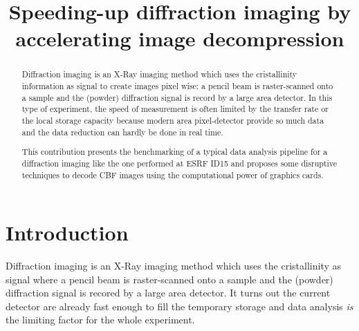 \documentclass[preprint, pdf]{iucr}              %
\begin{document}

\title{Speeding-up diffraction imaging by accelerating image decompression}

 





\maketitle                        %

\begin{synopsis}
\end{synopsis}

\begin{abstract}

Diffraction imaging is an X-Ray imaging method which uses the cristallinity
information as signal to create images pixel wise: 
a pencil beam is raster-scanned onto a sample and the (powder) diffraction
signal is record by a large area detector.
In this type of experiment, the speed of
measurement is often limited by the transfer rate or the local storage capacity
because modern area pixel-detector provide so much data and the data
reduction can hardly be done in real time.

This contribution presents the benchmarking of a typical data
analysis pipeline for a diffraction imaging like the one performed at ESRF ID15
and proposes some disruptive techniques to decode CBF images using the
computational power of graphics cards. 

\end{abstract}


\section{Introduction}

Diffraction imaging is an X-Ray imaging method which uses the cristallinity
as signal where a pencil beam is raster-scanned onto a sample and the
(powder) diffraction signal is recored by a large area detector.
It turns out the current detector are already
fast enough to fill the temporary storage and data analysis \emph{is} the
limiting factor for the whole experiment. 
\end{document}
